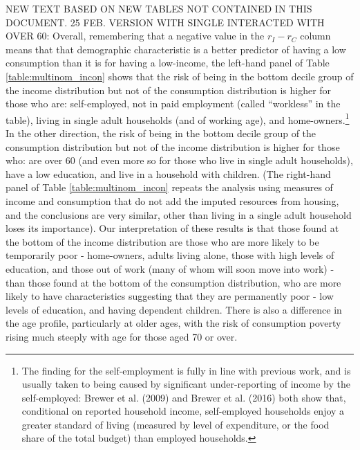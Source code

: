 NEW TEXT BASED ON NEW TABLES NOT CONTAINED IN THIS DOCUMENT. 25 FEB.  VERSION WITH SINGLE INTERACTED WITH OVER 60: Overall, remembering that a negative value in the $r_{I}-r_{C}$ column means that that demographic characteristic is a better predictor of having a low consumption than it is for having a low-income, the left-hand panel of Table \ref{table:multinom_incon} shows that the risk of being in the bottom decile group of the income distribution but not of the consumption distribution is higher for those who are: self-employed, not in paid employment (called ``workless'' in the table), living in single adult households (and of working age), and home-owners.\footnote{The finding for the self-employment is fully in line with previous work, and is usually taken to being caused by significant under-reporting of income by the self-employed: Brewer et al. (2009) and Brewer et al. (2016) both show that, conditional on reported household income, self-employed households enjoy a greater standard of living (measured by level of expenditure, or the food share of the total budget) than employed households.} In the other direction, the risk of being in the bottom decile group of the consumption distribution but not of the income distribution is higher for those who: are over 60 (and even more so for those who live in single adult households), have a low education, and live in a household with children. (The right-hand panel of Table \ref{table:multinom_incon} repeats the analysis using measures of income and consumption that do not add the imputed resources from housing, and the conclusions are very similar, other than living in a single adult household loses its importance). Our interpretation of these results is that those found at the bottom of the income distribution are those who are more likely to be temporarily poor - home-owners, adults living alone, those with high levels of education, and those out of work (many of whom will soon move into work) - than those found at the bottom of the consumption distribution, who are more likely to have characteristics suggesting that they are permanently poor - low levels of education, and having dependent children. There is also a difference in the age profile, particularly at older ages, with the risk of consumption poverty rising much steeply with age for those aged 70 or over.

